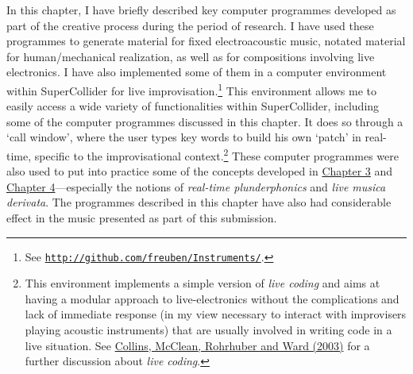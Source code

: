 \hypertarget{improvprog}{}
In this chapter, I have briefly described key computer programmes developed as part of the creative process during the period of research. I have used these programmes to generate material for fixed electroacoustic music, notated material for human/mechanical realization, as well as for compositions involving live electronics. I have also implemented some of them in a computer environment within SuperCollider for live improvisation.\footnote{See \href{http://github.com/freuben/Instruments/}{\texttt{http://github.com/freuben/Instruments/}}.} This environment allows me to easily access a wide variety of functionalities within SuperCollider, including some of the computer programmes discussed in this chapter. It does so through a `call window', where the user types key words to build his own `patch' in real-time, specific to the improvisational context.\footnote{This environment implements a simple version of \emph{live coding} and aims at having a modular approach to live-electronics without the complications and lack of immediate response (in my view necessary to interact with improvisers playing acoustic instruments) that are usually involved in writing code in a live situation. See \hyperlink{livecoding}{Collins, McClean, Rohrhuber and Ward (2003)} for a further discussion about \emph{live coding}.} These computer programmes were also used to put into practice some of the concepts developed in \hyperlink{chapter3}{Chapter 3} and \hyperlink{chapter4}{Chapter 4}---especially the notions of \emph{real-time plunderphonics} and \emph{live musica derivata}. The programmes described in this chapter have also had considerable effect in the music presented as part of this submission.

\label{ch:compapp}